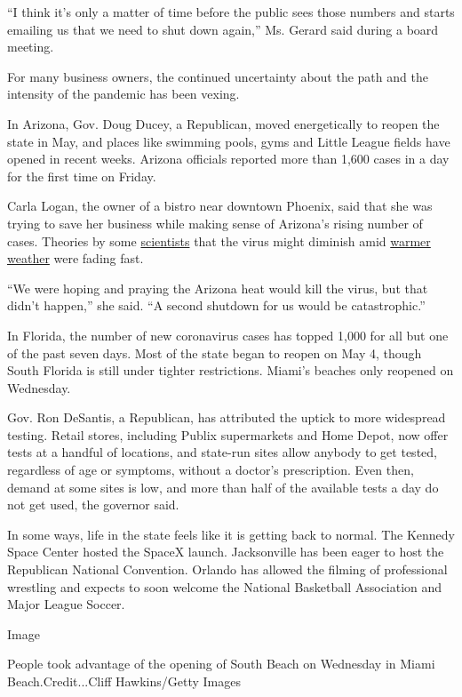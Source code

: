 ``I think it's only a matter of time before the public sees those
numbers and starts emailing us that we need to shut down again,'' Ms.
Gerard said during a board meeting.

For many business owners, the continued uncertainty about the path and
the intensity of the pandemic has been vexing.

In Arizona, Gov. Doug Ducey, a Republican, moved energetically to reopen
the state in May, and places like swimming pools, gyms and Little League
fields have opened in recent weeks. Arizona officials reported more than
1,600 cases in a day for the first time on Friday.

Carla Logan, the owner of a bistro near downtown Phoenix, said that she
was trying to save her business while making sense of Arizona's rising
number of cases. Theories by some
\href{https://www.nytimes.com/interactive/2020/05/21/opinion/coronavirus-warm-weather-summer-infections.html}{scientists}
that the virus might diminish amid
\href{https://directorsblog.nih.gov/2020/06/02/will-warm-weather-slow-spread-of-novel-coronavirus/}{warmer
weather} were fading fast.

``We were hoping and praying the Arizona heat would kill the virus, but
that didn't happen,'' she said. ``A second shutdown for us would be
catastrophic.''

In Florida, the number of new coronavirus cases has topped 1,000 for all
but one of the past seven days. Most of the state began to reopen on May
4, though South Florida is still under tighter restrictions. Miami's
beaches only reopened on Wednesday.

Gov. Ron DeSantis, a Republican, has attributed the uptick to more
widespread testing. Retail stores, including Publix supermarkets and
Home Depot, now offer tests at a handful of locations, and state-run
sites allow anybody to get tested, regardless of age or symptoms,
without a doctor's prescription. Even then, demand at some sites is low,
and more than half of the available tests a day do not get used, the
governor said.

In some ways, life in the state feels like it is getting back to normal.
The Kennedy Space Center hosted the SpaceX launch. Jacksonville has been
eager to host the Republican National Convention. Orlando has allowed
the filming of professional wrestling and expects to soon welcome the
National Basketball Association and Major League Soccer.

Image

People took advantage of the opening of South Beach on Wednesday in
Miami Beach.Credit...Cliff Hawkins/Getty Images

